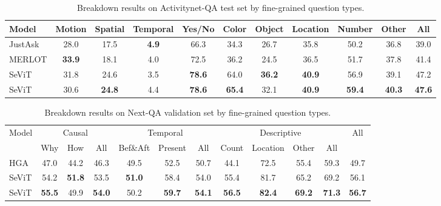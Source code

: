 \documentclass{article}
\newcommand{\frameworkname}{SeViT}
\begin{document}
\begin{table*}[t!]
    \centering
    \small
    \caption{Breakdown results on Activitynet-QA test set by fine-grained question types.}
    \vskip 0.15in
\vskip 0.15in
   \begin{adjustbox}{width=0.85\textwidth} 
    \begin{tabular}{lcccccccccc}
        \toprule
        Model & Motion & Spatial & Temporal & Yes/No & Color & Object & Location & Number & Other & All \\
        \midrule
        JustAsk & 28.0 & 17.5 & \textbf{4.9} & 66.3 & 34.3 & 26.7 & 35.8 & 50.2 & 36.8 & 39.0 \\
        MERLOT & \textbf{33.9} & 18.1 & 4.0 & 72.5 & 36.2 & 24.5 & 36.5 & 51.7 & 37.8 & 41.4 \\
        \midrule
        \frameworkname{} & 31.8 & 24.6 & 3.5 & \textbf{78.6} & 64.0 & \textbf{36.2} & \textbf{40.9} & 56.9 & 39.1 & 47.2 \\
        \frameworkname{} & 30.6 & \textbf{24.8} & 4.4 & \textbf{78.6} & \textbf{65.4} & 32.1 & \textbf{40.9} & \textbf{59.4} & \textbf{40.3} & \textbf{47.6} \\
        \bottomrule
    \end{tabular}
    \end{adjustbox}
\label{table:activitynet_question}
\end{table*} \begin{table*}[t!]
    \centering
    \small
    \caption{Breakdown results on Next-QA validation set by fine-grained question types.}
    \vskip 0.15in
\vskip 0.15in
   \begin{adjustbox}{width=0.85\textwidth} 
    \begin{tabular}{lccccccccccc}
        \toprule
        \multirow{2}[3]{*}{Model} & \multicolumn{3}{c}{Causal} & \multicolumn{3}{c}{Temporal} & \multicolumn{4}{c}{Descriptive}& \multirow{2}[3]{*}{All} \\
        \cmidrule(r){2-4}
        \cmidrule(r){5-7}
        \cmidrule(r){8-11}
        & Why & How & All & Bef\&Aft & Present & All & Count & Location & Other & All & \\
        \midrule
        HGA & 47.0 & 44.2 & 46.3 & 49.5 & 52.5 & 50.7 & 44.1 & 72.5 & 55.4 & 59.3 & 49.7 \\
        \midrule
        \frameworkname{} & 54.2 & \textbf{51.8} & 53.5 & \textbf{51.0} & 58.4 & 54.0 & 55.4 & 81.7 & 65.2 & 69.2 & 56.1 \\
        \frameworkname{} & \textbf{55.5} & 49.9 & \textbf{54.0} & 50.2 & \textbf{59.7} & \textbf{54.1} & \textbf{56.5} & \textbf{82.4} & \textbf{69.2} & \textbf{71.3} & \textbf{56.7} \\

\end{tabular}
\end{adjustbox}
\end{table*}
\end{document}
